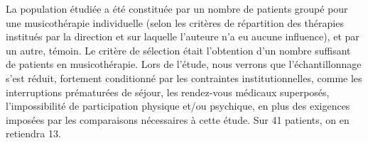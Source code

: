  La population étudiée a été constituée par un nombre de patients groupé pour une musicothérapie 
 individuelle (selon les critères de 
 répartition des thérapies institués par 
 la direction et 
 sur laquelle l'auteure n'a eu aucune influence),  et par un autre, témoin.
  Le critère de sélection était l'obtention
 d'un nombre suffisant de 
 patients en musicothérapie.
  Lors de l'étude, nous verrons que l'échantillonnage s'est réduit, fortement conditionné par les 
  contraintes
  institutionnelles, comme les interruptions prématurées de séjour, les rendez-vous
  médicaux superposés, l'impossibilité de participation physique et/ou
  psychique, 
   en plus des exigences imposées par les comparaisons nécessaires à cette étude. Sur 41 patients, on 
   en retiendra 13.
